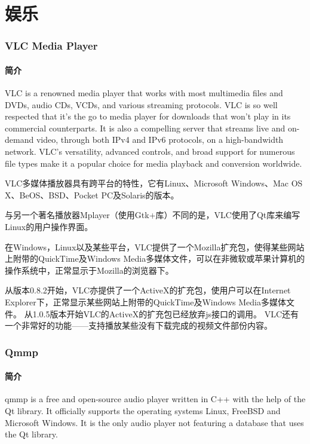 \documentclass[paper=a4,fontsize=11pt]{article}
\begin{document}
	\clearpage
	
	\part{娱乐}
	
	\clearpage
	
	\section{VLC Media Player}	
	
	\subsection{简介}
	VLC is a renowned media player that works with most multimedia files and DVDs, audio CDs, VCDs, and various streaming protocols. VLC is so well respected that it’s the go to media player for downloads that won’t play in its commercial counterparts. It is also a compelling server that streams live and on-demand video, through both IPv4 and IPv6 protocols, on a high-bandwidth network. VLC’s versatility, advanced controls, and broad support for numerous file types make it a popular choice for media playback and conversion worldwide. 
	
	VLC多媒体播放器具有跨平台的特性，它有Linux、Microsoft Windows、Mac OS X、BeOS、BSD、Pocket PC及Solaris的版本。
	
	与另一个著名播放器Mplayer（使用Gtk+库）不同的是，VLC使用了Qt库来编写Linux的用户操作界面。
	
	在Windows，Linux以及某些平台，VLC提供了一个Mozilla扩充包，使得某些网站上附带的QuickTime及Windows Media多媒体文件，可以在非微软或苹果计算机的操作系统中，正常显示于Mozilla的浏览器下。
	
	从版本0.8.2开始，VLC亦提供了一个ActiveX的扩充包，使用户可以在Internet Explorer下，正常显示某些网站上附带的QuickTime及Windows Media多媒体文件。
	从1.0.5版本开始VLC的ActiveX的扩充包已经放弃js接口的调用。
	VLC还有一个非常好的功能——支持播放某些没有下载完成的视频文件部份内容。
	
	\section{Qmmp}
	
	\subsection{简介}
	qmmp is a free and open-source audio player written in C++ with the help of the Qt library. It officially supports the operating systems Linux, FreeBSD and Microsoft Windows. It is the only audio player not featuring a database that uses the Qt library.
	
\end{document}
